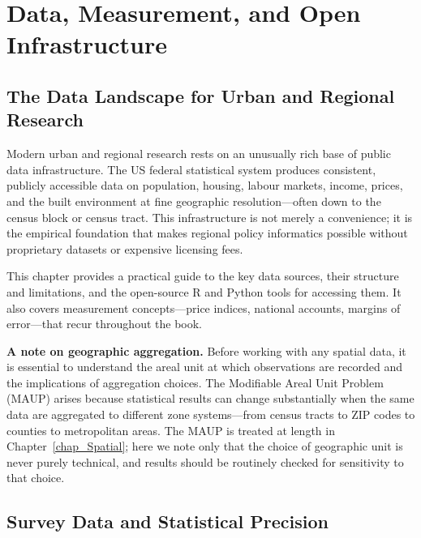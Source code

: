 
\chapter{Data, Measurement, and Open Infrastructure}
\label{chap_Data}

\section{The Data Landscape for Urban and Regional Research}
\label{sec_DataLandscape}

Modern urban and regional research rests on an unusually rich base of public
data infrastructure. The US federal statistical system produces consistent,
publicly accessible data on population, housing, labour markets, income,
prices, and the built environment at fine geographic resolution---often down
to the census block or census tract. This infrastructure is not merely a
convenience; it is the empirical foundation that makes regional policy
informatics possible without proprietary datasets or expensive licensing fees.

This chapter provides a practical guide to the key data sources, their
structure and limitations, and the open-source R and Python tools for
accessing them. It also covers measurement concepts---price indices, national
accounts, margins of error---that recur throughout the book.

\noindent\textbf{A note on geographic aggregation.} Before working with any
spatial data, it is essential to understand the areal unit at which
observations are recorded and the implications of aggregation choices. The
Modifiable Areal Unit Problem (MAUP) arises because statistical
results can change substantially when the same data are aggregated to
different zone systems---from census tracts to ZIP codes to counties to
metropolitan areas. The MAUP is treated at length in
Chapter~\ref{chap_Spatial}; here we note only that the choice of geographic
unit is never purely technical, and results should be routinely checked for
sensitivity to that choice.


\section{Survey Data and Statistical Precision}
\label{sec_SurveyData}

